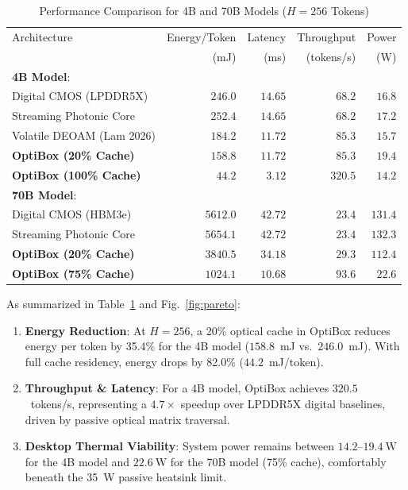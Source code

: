 \documentclass[conference]{IEEEtran}
\begin{document}
\begin{table}[t]
\centering
\caption{Performance Comparison for 4B and 70B Models ($H=256$ Tokens)}
\label{tab:comparison}
\begin{tabular}{lrrrr}
\toprule
Architecture & Energy/Token & Latency & Throughput & Power \\
 & (mJ) & (ms) & (tokens/s) & (W) \\
\midrule
\textbf{4B Model}: & & & & \\
Digital CMOS (LPDDR5X) & $246.0$ & $14.65$ & $68.2$ & $16.8$ \\
Streaming Photonic Core & $252.4$ & $14.65$ & $68.2$ & $17.2$ \\
Volatile DEOAM (Lam 2026) & $184.2$ & $11.72$ & $85.3$ & $15.7$ \\
\textbf{OptiBox (20\% Cache)} & $\mathbf{158.8}$ & $\mathbf{11.72}$ & $\mathbf{85.3}$ & $\mathbf{19.4}$ \\
\textbf{OptiBox (100\% Cache)} & $\mathbf{44.2}$ & $\mathbf{3.12}$ & $\mathbf{320.5}$ & $\mathbf{14.2}$ \\
\midrule
\textbf{70B Model}: & & & & \\
Digital CMOS (HBM3e) & $5612.0$ & $42.72$ & $23.4$ & $131.4$ \\
Streaming Photonic Core & $5654.1$ & $42.72$ & $23.4$ & $132.3$ \\
\textbf{OptiBox (20\% Cache)} & $\mathbf{3840.5}$ & $\mathbf{34.18}$ & $\mathbf{29.3}$ & $\mathbf{112.4}$ \\
\textbf{OptiBox (75\% Cache)} & $\mathbf{1024.1}$ & $\mathbf{10.68}$ & $\mathbf{93.6}$ & $\mathbf{22.6}$ \\
\bottomrule
\end{tabular}
\end{table}

As summarized in Table~\ref{tab:comparison} and Fig.~\ref{fig:pareto}:
\begin{enumerate}
\item \textbf{Energy Reduction}: At $H=256$, a 20\% optical cache in OptiBox reduces energy per token by 35.4\% for the 4B model ($158.8$~mJ vs.\ $246.0$~mJ). With full cache residency, energy drops by 82.0\% ($44.2$~mJ/token).
\item \textbf{Throughput \& Latency}: For a 4B model, OptiBox achieves $320.5$~tokens/s, representing a $4.7\times$ speedup over LPDDR5X digital baselines, driven by passive optical matrix traversal.
\item \textbf{Desktop Thermal Viability}: System power remains between $14.2\text{--}19.4~\text{W}$ for the 4B model and $22.6~\text{W}$ for the 70B model (75\% cache), comfortably beneath the 35~W passive heatsink limit.
\end{enumerate}
\end{document}
